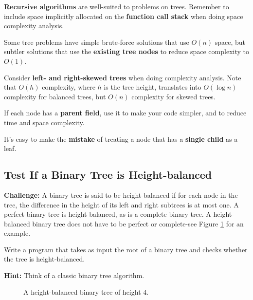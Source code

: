 \documentclass[11pt,a4paper]{article}
\begin{document}
\textbf{Recursive algorithms} are well-suited to problems on trees. Remember to
include space implicitly allocated on the \textbf{function call stack} when
doing space complexity analysis. 

Some tree problems have simple brute-force solutions that use $O(n)$ space, but
subtler solutions that use the \textbf{existing tree nodes} to reduce space
complexity to $O(1)$.

Consider \textbf{left- and right-skewed trees} when doing complexity analysis.
Note that $O(h)$ complexity, where $h$ is the tree height, translates into
$O(\log n)$ complexity for balanced trees, but $O(n)$ complexity for skewed
trees.

If each node has a \textbf{parent field}, use it to make your code simpler, and
to reduce time and space complexity.

It's easy to make the \textbf{mistake} of treating a node that has a
\textbf{single child} as a leaf.

\subsection{Test If a Binary Tree is Height-balanced}

\textbf{Challenge:} A binary tree is said to be height-balanced if for each 
node in the tree, the difference in the height of its left and right subtrees 
is at most one. A perfect binary tree is height-balanced, as is a complete 
binary tree. A height-balanced binary tree does not have to be perfect or 
complete-see Figure \ref{fig:balancedtree} for an example.

Write a program that takes as input the root of a binary tree and checks 
whether the tree is height-balanced.

\textbf{Hint:} Think of a classic binary tree algorithm.

\begin{figure}[hb]
  \centering
  \caption{A height-balanced binary tree of height $4$.}
  \label{fig:balancedtree}
\end{figure}
\end{document}
